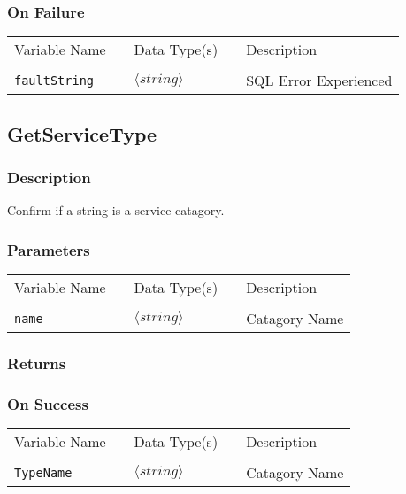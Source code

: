 \subsubsection{On Failure}

\begin{tabular}{lllll}
Variable Name	&		&	Data Type(s)		&	&	Description	\\
				&	&	&	&	\\
\verb!faultString! & \hspace{15mm} & $\langle string\rangle $ & \hspace{15mm} & SQL Error Experienced \\
\end{tabular}


\subsection{GetServiceType}

\subsubsection{Description}

Confirm if a string is a service catagory.

\subsubsection{Parameters}

\begin{tabular}{lllll}
Variable Name	&		&	Data Type(s)		&	&	Description	\\
				&	&	&	&	\\
\verb!name! & \hspace{15mm} & $\langle string\rangle $ & \hspace{15mm} & Catagory Name \\
\end{tabular}

\subsubsection{Returns}

\subsubsection{On Success}

\begin{tabular}{lllll}
Variable Name	&		&	Data Type(s)		&	&	Description	\\
				&	&	&	&	\\
\verb!TypeName! & \hspace{15mm} & $\langle string\rangle $ & \hspace{15mm} & Catagory Name \\
\end{tabular}
